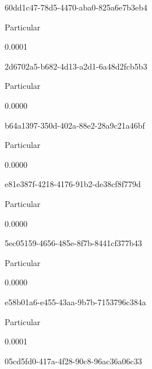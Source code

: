 \documentclass[
  11pt,
  a4paper,
  DIV=11,
  numbers=noendperiod]{scrartcl}
\begin{document}
60dd1c47-78d5-4470-aba0-825a6e7b3eb4

\n      

Particular

\n      

0.0001

\n    

\n    

\n      

2d6702a5-b682-4d13-a2d1-6a48d2fcb5b3

\n      

Particular

\n      

0.0000

\n    

\n    

\n      

b64a1397-350d-402a-88e2-28a9c21a46bf

\n      

Particular

\n      

0.0000

\n    

\n    

\n      

e81e387f-4218-4176-91b2-de38cf8f779d

\n      

Particular

\n      

0.0000

\n    

\n    

\n      

5ec05159-4656-485e-8f7b-8441cf377b43

\n      

Particular

\n      

0.0000

\n    

\n    

\n      

e58b01a6-e455-43aa-9b7b-7153796c384a

\n      

Particular

\n      

0.0001

\n    

\n    

\n      

05cd5fd0-417a-4f28-90c8-96ac36a06c33
\end{document}
